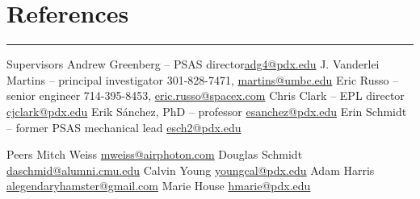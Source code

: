 
\vfill
\section{References}
\noindent\rule{\textwidth}{\hlinewidth}
	\begin{innerlist}
	\item Supervisors
		\subitem Andrew Greenberg -- PSAS director\hfill\href{mailto:adg4@pdx.edu}{adg4@pdx.edu} %
        \subitem J. Vanderlei Martins -- principal investigator \hfill 301-828-7471, \href{mailto:martins@umbc.edu}{martins@umbc.edu}
		\subitem Eric Russo -- senior engineer \hfill 714-395-8453, \href{mailto:eric.russo@spacex.com}{eric.russo@spacex.com}
		\subitem Chris Clark -- EPL director \hfill\href{mailto:cjclark@pdx.edu}{cjclark@pdx.edu} %
		\subitem Erik S\'anchez, PhD -- professor \hfill\href{mailto:esanchez@pdx.edu}{esanchez@pdx.edu}
		\subitem Erin Schmidt -- former PSAS mechanical lead \hfill\href{mailto:esch2@pdx.edu}{esch2@pdx.edu}
	\item Peers
        \subitem Mitch Weiss \hfill \href{mailto:mweiss@airphoton.com}{mweiss@airphoton.com}
		\subitem Douglas Schmidt \hfill\href{mailto:daschmid@alumni.cmu.edu}{daschmid@alumni.cmu.edu}
		\subitem Calvin Young \hfill\href{mailto:youngcal@pdx.edu}{youngcal@pdx.edu}
		\subitem Adam Harris \hfill\href{mailto:alegendaryhamster@gmail.com}{alegendaryhamster@gmail.com} %
		\subitem Marie House \hfill\href{mailto:hmarie@pdx.edu}{hmarie@pdx.edu}
	\end{innerlist}

